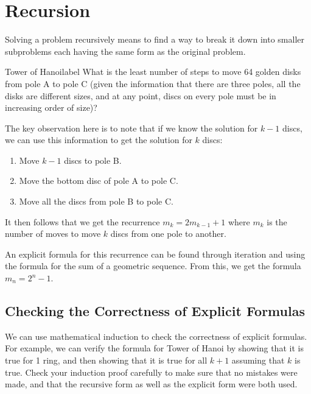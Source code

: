 \documentclass[a4paper]{report}
\begin{document}
\section{Recursion}

Solving a problem recursively means to find a way to break it down into smaller subproblems each having the same form as the original problem.

\begin{example}{Tower of Hanoi}{label}
    What is the least number of steps to move 64 golden disks from pole A to pole C (given the information that
    there are three poles, all the disks are different sizes, and at any point, discs on every pole must be in
    increasing order of size)?
\end{example}

The key observation here is to note that if we know the solution for $k-1$ discs, we can use this information to
get the solution for $k$ discs:

\begin{enumerate}
    \item Move $k-1$ discs to pole B.
    \item Move the bottom disc of pole A to pole C.
    \item Move all the discs from pole B to pole C.
\end{enumerate}

It then follows that we get the recurrence $m_k=2m_{k-1}+1$ where $m_k$ is the number of moves to move $k$ discs from
one pole to another.

An explicit formula for this recurrence can be found through iteration and using the formula for the sum of a geometric
sequence. From this, we get the formula $m_n = 2^n-1$.

\subsection{Checking the Correctness of Explicit Formulas}

We can use mathematical induction to check the correctness of explicit formulas. For example, we can verify the formula for
Tower of Hanoi by showing that it is true for 1 ring, and then showing that it is true for all $k+1$ assuming that $k$ is true.
Check your induction proof carefully to make sure that no mistakes were made, and that the recursive form as well as the
explicit form were both used.
\end{document}
